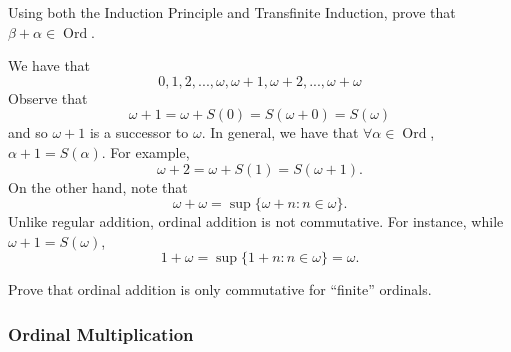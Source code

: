 \documentclass[notoc,notitlepage]{tufte-book}
\DeclareMathOperator{\Ord}{Ord }
\begin{document}
\begin{ex}
  Using both the Induction Principle and Transfinite Induction, prove that $\beta + \alpha \in \Ord$.
\end{ex}

\begin{eg}
  We have that
  \begin{equation*}
    0, 1, 2, ..., \omega, \omega + 1, \omega + 2, ..., \omega + \omega
  \end{equation*}
  Observe that
  \begin{equation*}
    \omega + 1 = \omega + S(0) = S(\omega + 0) = S(\omega)
  \end{equation*}
  and so $\omega + 1$ is a successor to $\omega$. In general, we have that $\forall \alpha \in \Ord$, $\alpha + 1 = S(\alpha)$. For example,
  \begin{equation*}
    \omega + 2 = \omega + S(1) = S(\omega + 1).
  \end{equation*}
  On the other hand, note that
  \begin{equation*}
    \omega + \omega = \sup \{ \omega + n : n \in \omega \}.
  \end{equation*}
  Unlike regular addition, ordinal addition is not commutative. For instance, while $\omega + 1 = S(\omega)$,
  \begin{equation*}
    1 + \omega = \sup \{ 1 + n : n \in \omega \} = \omega.
  \end{equation*}
\end{eg}

\begin{ex}
  Prove that ordinal addition is only commutative for ``finite'' ordinals.
\end{ex}

\subsubsection{Ordinal Multiplication}
\label{ssub:Ordinal Multiplication}
\end{document}
